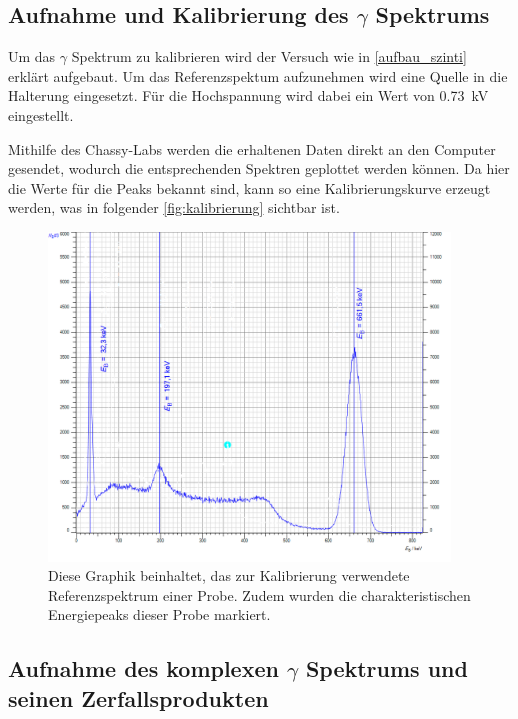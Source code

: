 \documentclass[12pt,english,ngerman]{scrartcl}
\begin{document}
\subsection{Aufnahme und Kalibrierung des \texorpdfstring{$\gamma$}{gamma}
	Spektrums}\label{sec:aufname_kalibrierungsspektrum}

Um das \(\gamma\) Spektrum zu kalibrieren wird der Versuch wie in
\autoref{aufbau_szinti} erklärt aufgebaut. Um das Referenzspektum aufzunehmen
wird eine  Quelle in die Halterung eingesetzt. Für die
Hochspannung wird dabei ein Wert von \SI{0.73}{\kilo\volt} eingestellt.

Mithilfe des Chassy-Labs werden die erhaltenen Daten direkt an den Computer
gesendet, wodurch die entsprechenden Spektren geplottet werden können. Da hier
die Werte für die Peaks bekannt sind, kann so eine Kalibrierungskurve erzeugt
werden, was in folgender \autoref{fig:kalibrierung} sichtbar ist.

\begin{figure}[H]
	\begin{center}
		\includegraphics[width = 0.95\textwidth]{./figures/c137kalibrierung.png}
	\end{center}
	\caption[Kalibrierungsmessung einer ]{Diese Graphik
		beinhaltet, das zur Kalibrierung verwendete Referenzspektrum einer
		 Probe. Zudem wurden die charakteristischen Energiepeaks
		dieser Probe markiert.}\label{fig:kalibrierung}
\end{figure}

\subsection{Aufnahme des komplexen \texorpdfstring{$\gamma$}{gamma}
	Spektrums und seinen Zerfallsprodukten}\label{sec:aufname_Ra_zerfallsreihe}
\end{document}
